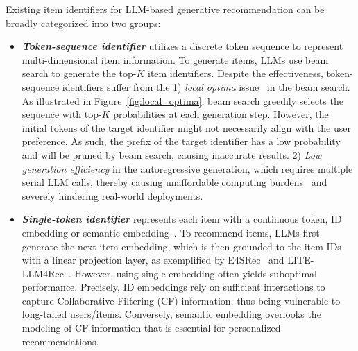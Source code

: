 Existing item identifiers for LLM-based generative recommendation can be broadly categorized into two groups: 
\begin{itemize}[leftmargin=*]
    \item \textit{\textbf{Token-sequence identifier}} utilizes a discrete token sequence to represent multi-dimensional item information. 
    To generate items, LLMs use beam search to generate the top-$K$ item identifiers. 
    Despite the effectiveness, token-sequence identifiers suffer from the 
    1) \textit{local optima} issue~\cite{zhou2005beam} in the beam search. 
    As illustrated in Figure~\ref{fig:local_optima}, beam search greedily selects the sequence with top-$K$ probabilities at each generation step. 
    However, the initial tokens of the target identifier might not necessarily align with the user preference. 
    As such, the prefix of the target identifier has a low probability and will be pruned by beam search, causing inaccurate results. 
    2) \textit{Low generation efficiency} in the autoregressive generation, which requires multiple serial LLM calls, thereby causing unaffordable computing burdens~\cite{lin2024efficient} and severely hindering real-world deployments. 

    \item \textbf{\textit{Single-token identifier}} represents each item with a continuous token, \ie ID embedding or semantic embedding~\cite{liao2024llara,wang2024rethinking}. 
    To recommend items, LLMs first generate the next item embedding, which is then grounded to the item IDs with a linear projection layer, as exemplified by E4SRec~\cite{li2023e4srec} and LITE-LLM4Rec~\cite{wang2024rethinking}. 
    However, using single embedding often yields suboptimal performance. 
    Precisely, ID embeddings rely on sufficient interactions to capture Collaborative Filtering (CF) information, thus being vulnerable to long-tailed users/items.  
    Conversely, semantic embedding overlooks the modeling of CF information that is essential for personalized recommendations. 
\end{itemize}




